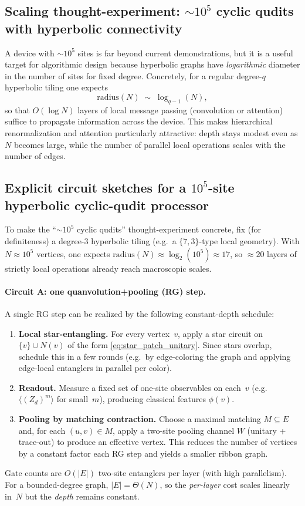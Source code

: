 \documentclass[11pt,oneside]{amsbook}
\numberwithin{equation}{section}
\theoremstyle{plain}
\theoremstyle{definition}
\theoremstyle{remark}
\begin{document}
\subsection{Scaling thought-experiment: $\sim 10^5$ cyclic qudits with hyperbolic connectivity}
A device with $\sim 10^5$ sites is far beyond current demonstrations, but it is a useful target for
algorithmic design because hyperbolic graphs have \emph{logarithmic} diameter in the number of sites
for fixed degree. Concretely, for a regular degree-$q$ hyperbolic tiling one expects
\[
  \mathrm{radius}(N) \;\sim\; \log_{q-1}(N),
\]
so that $O(\log N)$ layers of local message passing (convolution or attention) suffice to propagate
information across the device.
This makes hierarchical renormalization and attention particularly attractive: depth stays modest even
as $N$ becomes large, while the number of parallel local operations scales with the number of edges.

\subsection{Explicit circuit sketches for a \texorpdfstring{$10^5$}{1e5}-site hyperbolic cyclic-qudit processor}
\label{subsec:explicit_hyperbolic_circuits}

To make the ``$\sim 10^5$ cyclic qudits'' thought-experiment concrete, fix (for definiteness) a degree-$3$
hyperbolic tiling (e.g.\ a $\{7,3\}$-type local geometry). With $N\approx 10^5$ vertices, one expects
$\mathrm{radius}(N)\approx \log_2(10^5)\approx 17$, so $\approx 20$ layers of strictly local operations already
reach macroscopic scales.

\paragraph{Circuit A: one quanvolution+pooling (RG) step.}
A single RG step can be realized by the following constant-depth schedule:
\begin{enumerate}
\item \textbf{Local star-entangling.} For every vertex~$v$, apply a star circuit on $\{v\}\cup N(v)$ of the form
\eqref{eq:star_patch_unitary}. Since stars overlap, schedule this in a few rounds (e.g.\ by edge-coloring the
graph and applying edge-local entanglers in parallel per color).
\item \textbf{Readout.} Measure a fixed set of one-site observables on each~$v$ (e.g.\ $\langle (Z_d)^m\rangle$ for
small~$m$), producing classical features $\phi(v)$.
\item \textbf{Pooling by matching contraction.} Choose a maximal matching $M\subseteq E$ and, for each $(u,v)\in M$,
apply a two-site pooling channel $W$ (unitary + trace-out) to produce an effective vertex. This reduces the number
of vertices by a constant factor each RG step and yields a smaller ribbon graph.
\end{enumerate}
Gate counts are $O(|E|)$ two-site entanglers per layer (with high parallelism). For a bounded-degree graph,
$|E|=\Theta(N)$, so the \emph{per-layer} cost scales linearly in~$N$ but the \emph{depth} remains constant.
\end{document}
